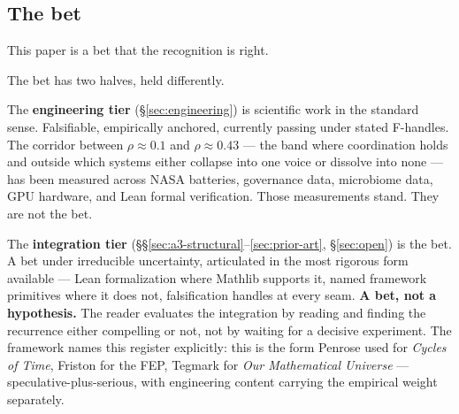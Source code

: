 \documentclass[11pt,a4paper]{article}
\begin{document}
\subsection*{The bet}

This paper is a bet that the recognition is right.

The bet has two halves, held differently.

The \textbf{engineering tier} (\S\ref{sec:engineering}) is scientific work in the standard sense. Falsifiable, empirically anchored, currently passing under stated F-handles. The corridor between $\rho \approx 0.1$ and $\rho \approx 0.43$ --- the band where coordination holds and outside which systems either collapse into one voice or dissolve into none --- has been measured across NASA batteries, governance data, microbiome data, GPU hardware, and Lean formal verification. Those measurements stand. They are not the bet.

The \textbf{integration tier} (\S\S\ref{sec:a3-structural}--\ref{sec:prior-art}, \S\ref{sec:open}) is the bet. A bet under irreducible uncertainty, articulated in the most rigorous form available --- Lean formalization where Mathlib supports it, named framework primitives where it does not, falsification handles at every seam. \textbf{A bet, not a hypothesis.} The reader evaluates the integration by reading and finding the recurrence either compelling or not, not by waiting for a decisive experiment. The framework names this register explicitly: this is the form Penrose used for \emph{Cycles of Time}, Friston for the FEP, Tegmark for \emph{Our Mathematical Universe} --- speculative-plus-serious, with engineering content carrying the empirical weight separately.
\end{document}
